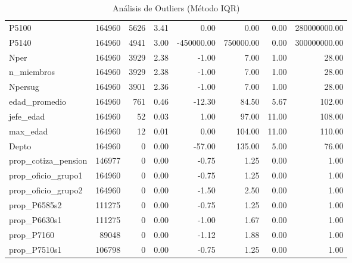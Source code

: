 \begin{table}[ht]
\begin{tabular}{lrrrrrrr}
  P5100 & 164960 & 5626 & 3.41 & 0.00 & 0.00 & 0.00 & 280000000.00 \\ 
  P5140 & 164960 & 4941 & 3.00 & -450000.00 & 750000.00 & 0.00 & 300000000.00 \\ 
  Nper & 164960 & 3929 & 2.38 & -1.00 & 7.00 & 1.00 & 28.00 \\ 
  n\_miembros & 164960 & 3929 & 2.38 & -1.00 & 7.00 & 1.00 & 28.00 \\ 
  Npersug & 164960 & 3901 & 2.36 & -1.00 & 7.00 & 1.00 & 28.00 \\ 
  edad\_promedio & 164960 & 761 & 0.46 & -12.30 & 84.50 & 5.67 & 102.00 \\ 
  jefe\_edad & 164960 &  52 & 0.03 & 1.00 & 97.00 & 11.00 & 108.00 \\ 
  max\_edad & 164960 &  12 & 0.01 & 0.00 & 104.00 & 11.00 & 110.00 \\ 
  Depto & 164960 &   0 & 0.00 & -57.00 & 135.00 & 5.00 & 76.00 \\ 
  prop\_cotiza\_pension & 146977 &   0 & 0.00 & -0.75 & 1.25 & 0.00 & 1.00 \\ 
  prop\_oficio\_grupo1 & 164960 &   0 & 0.00 & -0.75 & 1.25 & 0.00 & 1.00 \\ 
  prop\_oficio\_grupo2 & 164960 &   0 & 0.00 & -1.50 & 2.50 & 0.00 & 1.00 \\ 
  prop\_P6585s2 & 111275 &   0 & 0.00 & -0.75 & 1.25 & 0.00 & 1.00 \\ 
  prop\_P6630s1 & 111275 &   0 & 0.00 & -1.00 & 1.67 & 0.00 & 1.00 \\ 
  prop\_P7160 & 89048 &   0 & 0.00 & -1.12 & 1.88 & 0.00 & 1.00 \\ 
  prop\_P7510s1 & 106798 &   0 & 0.00 & -0.75 & 1.25 & 0.00 & 1.00 \\ 
   \bottomrule
\end{tabular}
\caption{Análisis de Outliers (Método IQR)} 
\label{tab:outliers}
\end{table}
